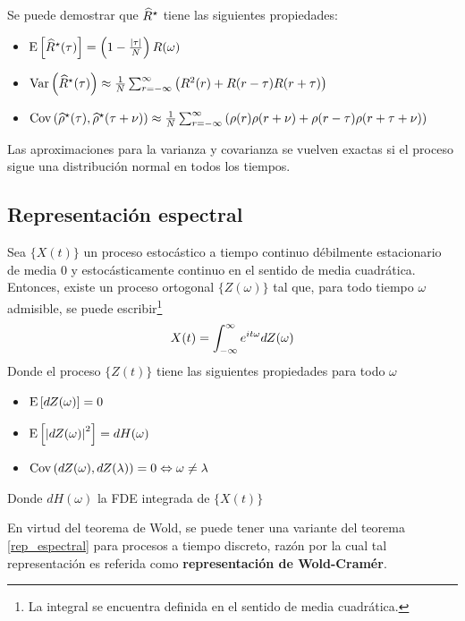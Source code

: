 Se puede demostrar que $\widehat{ R }^{\star}$ tiene las siguientes propiedades:
\begin{itemize}
\item $\mathrm{E}\left[ \widehat{ R }^{\star}(\tau) \right] = \left(1 - \frac{\left| \tau \right|}{N} \right) R(\omega)$
\item $\mathrm{Var}\left( \widehat{ R }^{\star}(\tau) \right) \approx \frac{1}{N} 
\sum_{r=-\infty}^{\infty} \left( R^{2}(r) + R(r-\tau)R(r+\tau) \right)$
\item $\mathrm{Cov}\left( \widehat{ \rho }^{\star}(\tau),\widehat{ \rho }^{\star}(\tau+\nu) \right) \approx \frac{1}{N} 
\sum_{r=-\infty}^{\infty} \left( \rho(r)\rho(r+\nu) + \rho(r-\tau)\rho(r+\tau+\nu) \right)$
\end{itemize}
Las aproximaciones para la varianza y covarianza se vuelven exactas si el proceso sigue una 
distribuci\'on normal en todos los tiempos.


\subsection{Representación espectral}

\begin{teorema}
Sea $\{X(t)\}$ un proceso estoc\'astico a tiempo continuo d\'ebilmente estacionario de media 0 y 
estoc\'asticamente continuo en el sentido de media cuadr\'atica. Entonces, existe un proceso 
ortogonal $\{Z(\omega)\}$ tal que, para todo tiempo $\omega$ admisible, se puede 
escribir\footnote{La integral se encuentra definida en el sentido de media cuadr\'atica.}
\begin{equation*}
X(t) = \int_{-\infty}^{\infty} e^{i t \omega} dZ(\omega)
\end{equation*}
Donde el proceso $\{Z(t)\}$ tiene las siguientes propiedades para todo $\omega$
\begin{itemize}
\item $\mathrm{E}\left[ dZ(\omega) \right] = 0$
\item $\mathrm{E}\left[ \left| dZ(\omega) \right|^{2} \right] = dH(\omega)$
\item $\mathrm{Cov}\left( dZ(\omega),dZ(\lambda) \right) = 0 \Leftrightarrow \omega \neq \lambda$
\end{itemize}
Donde $dH(\omega)$ la FDE integrada de $\{X(t)\}$
\end{teorema}

En virtud del teorema de Wold, se puede tener una variante del teorema \ref{rep_espectral}
para procesos a tiempo discreto, raz\'on por la cual  
tal representaci\'on es referida como \textbf{representaci\'on de Wold-Cram\'er}.

